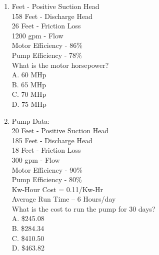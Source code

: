 \documentclass{article}
\begin{document}
\begin{enumerate}
\item Feet - Positive Suction Head\\
158 Feet - Discharge Head\\
26 Feet - Friction Loss\\
1200 gpm - Flow\\
Motor Efficiency - 86\%\\
Pump Efficiency - 78\%\\
What is the motor horsepower?\\
A. 60 MHp\\
B. 65 MHp\\
C. 70 MHp\\
D. 75 MHp\\

\item Pump Data:\\
20 Feet - Positive Suction Head\\
185 Feet - Discharge Head\\
18 Feet - Friction Loss\\
300 gpm - Flow\\
Motor Efficiency - 90\%\\
Pump Efficiency - 80\%\\
Kw-Hour Cost = 0.11/Kw-Hr\\
Average Run Time – 6 Hours/day\\
What is the cost to run the pump for 30 days?\\
A. \$245.08\\
B. \$284.34\\
C. \$410.50\\
D. \$463.82\\


\end{enumerate}
\end{document}
